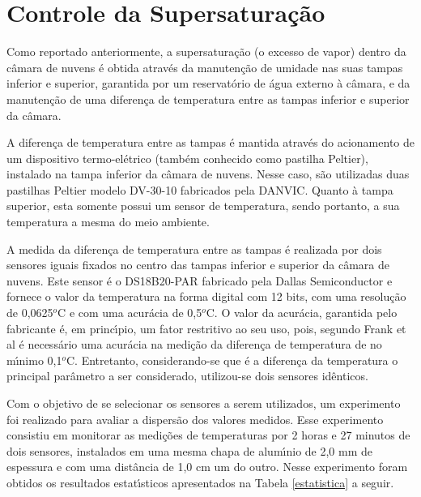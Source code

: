 \section{Controle da Supersatura\c{c}\~{a}o}

Como reportado anteriormente, a supersatura\c{c}\~{a}o (o excesso de vapor) dentro da c\^{a}mara de nuvens \'{e} obtida atrav\'{e}s da manuten\c{c}\~{a}o de umidade nas suas tampas inferior e superior, garantida por um reservat\'{o}rio de \'{a}gua externo \`{a} c\^{a}mara, e da manuten\c{c}\~{a}o de uma diferen\c{c}a de temperatura entre as tampas inferior e superior da c\^{a}mara.


A diferen\c{c}a de temperatura entre as tampas  \'{e} mantida atrav\'{e}s do acionamento de um dispositivo termo-el\'{e}trico (tamb\'{e}m conhecido como pastilha Peltier), instalado na tampa inferior da c\^{a}mara de nuvens. Nesse caso, s\~{a}o utilizadas duas pastilhas Peltier modelo DV-30-10 fabricados pela DANVIC. Quanto \`{a} tampa superior, esta somente possui um sensor de temperatura, sendo portanto, a sua temperatura a mesma do meio ambiente.

A medida da diferen\c{c}a de temperatura entre as tampas \'{e} realizada por dois sensores iguais fixados no centro das tampas inferior e superior da c\^{a}mara de nuvens. Este  sensor \'{e} o DS18B20-PAR fabricado pela Dallas Semiconductor e fornece o valor da temperatura na forma digital com 12 bits, com uma resolu\c{c}\~{a}o de 0,0625$^o$C e com uma acur\'{a}cia de 0,5$^o$C. O valor da acur\'{a}cia, garantida pelo fabricante \'{e}, em princ\'{\i}pio, um fator restritivo ao seu uso, pois, segundo Frank et al \cite{Frank} \'{e} necess\'{a}rio uma acur\'{a}cia na medi\c{c}\~{a}o da diferen\c{c}a de temperatura de no m\'{\i}nimo 0,1$^o$C. Entretanto, considerando-se que \'{e} a diferen\c{c}a da temperatura o principal par\^{a}metro a ser considerado, utilizou-se dois sensores id\^{e}nticos.

Com o objetivo de se selecionar os sensores a serem utilizados, um experimento  foi realizado para avaliar a dispers\~{a}o dos valores medidos. Esse experimento consistiu em monitorar as medi\c{c}\~{o}es de temperaturas por 2 horas e 27 minutos de dois sensores, instalados em uma mesma chapa de alum\'{\i}nio de 2,0 mm de espessura e com uma dist\^{a}ncia de 1,0 cm um do outro. Nesse experimento foram obtidos os resultados estat\'{\i}sticos apresentados na Tabela \ref{estatistica} a seguir.


